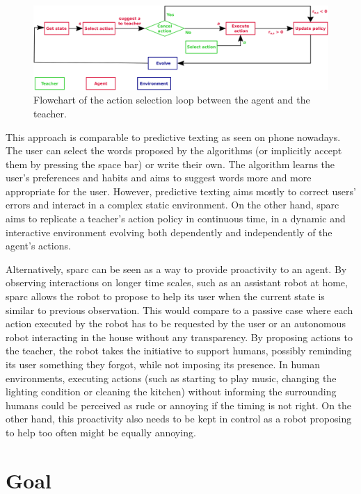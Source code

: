 \begin{figure}[ht]
	\includegraphics[width=1\linewidth]{flowchart.pdf}
	\centering
	\caption{Flowchart of the action selection loop between the agent and the teacher.}
	\label{fig:sparc_flowchart}
\end{figure}

This approach is comparable to predictive texting as seen on phone nowadays. The user can select the words proposed by the algorithms (or implicitly accept them by pressing the space bar) or write their own. The algorithm learns the user's preferences and habits and aims to suggest words more and more appropriate for the user. However, predictive texting aims mostly to correct users' errors and interact in a complex static environment. On the other hand, \gls{sparc} aims to replicate a teacher's action policy in continuous time, in a dynamic and interactive environment evolving both dependently and independently of the agent's actions.

Alternatively, \gls{sparc} can be seen as a way to provide proactivity to an agent. By observing interactions on longer time scales, such as an assistant robot at home, \gls{sparc} allows the robot to propose to help its user when the current state is similar to previous observation. This would compare to a passive case where each action executed by the robot has to be requested by the user or an autonomous robot interacting in the house without any transparency. By proposing actions to the teacher, the robot takes the initiative to support humans, possibly reminding its user something they forgot, while not imposing its presence. In human environments, executing actions (such as starting to play music, changing the lighting condition or cleaning the kitchen) without informing the surrounding humans could be perceived as rude or annoying if the timing is not right. On the other hand, this proactivity also needs to be kept in control as a robot proposing to help too often might be equally annoying.

\section{Goal}

